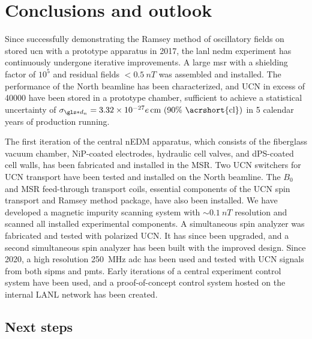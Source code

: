 
\chapter{Conclusions and outlook}\label{chap:conclusion}


Since successfully demonstrating the Ramsey method of oscillatory fields on stored \acrshort{ucn} with a prototype apparatus in 2017, the \acrshort{lanl} \acrshort{nedm} experiment has continuously undergone iterative improvements. A large \acrshort{msr} with a shielding factor of $10^5$ and residual fields $<\qty{0.5}{nT}$ was assembled and installed. The performance of the North beamline has been characterized, and UCN in excess of \num{40000} have been stored in a prototype chamber, sufficient to achieve a statistical uncertainty of $\sigma_{\gls*{d_n}}=\num{3.32e-27}e\,\text{cm (90\% \acrshort{cl})}$ in 5 calendar years of production running.

The first iteration of the central nEDM apparatus, which consists of the fiberglass vacuum chamber, NiP-coated electrodes, hydraulic cell valves, and dPS-coated cell walls, has been fabricated and installed in the MSR. Two UCN switchers for UCN transport have been tested and installed on the North beamline. The $B_0$ and MSR feed-through transport coils, essential components of the UCN spin transport and Ramsey method package, have also been installed. We have developed a magnetic impurity scanning system with $\sim \qty{0.1}{nT}$ resolution and scanned all installed experimental components. A simultaneous spin analyzer was fabricated and tested with polarized UCN. It has since been upgraded, and a second simultaneous spin analyzer has been built with the improved design. Since 2020, a high resolution \qty{250}{MHz} \acrshort{adc} has been used and tested with UCN signals from both \acrshort{sipm}s and \acrshort{pmt}s. Early iterations of a central experiment control system have been used, and a proof-of-concept control system hosted on the internal LANL network has been created.


\section{Next steps}


